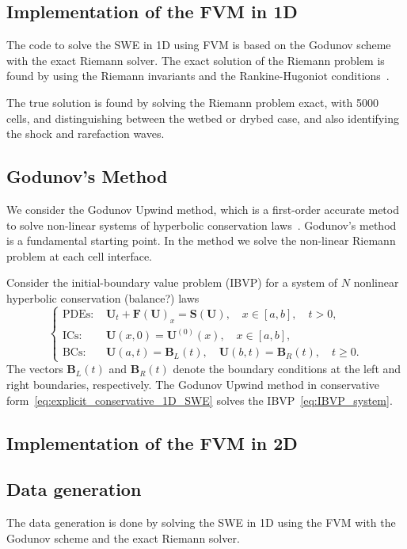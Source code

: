 \subsection{Implementation of the FVM in 1D}
The code to solve the SWE in 1D using FVM is based on the Godunov scheme with the exact Riemann solver.
The exact solution of the Riemann problem is found by using the Riemann invariants and the Rankine-Hugoniot conditions~\cite{trento_course}.

The true solution is found by solving the Riemann problem exact, with 5000 cells, and distinguishing between the wetbed or drybed case, and also identifying the shock and rarefaction waves.


\subsection{Godunov's Method}
We consider the Godunov Upwind method, which is a first-order accurate metod to solve non-linear systems of hyperbolic conservation laws~\cite{Toro2024}.
Godunov's method is a fundamental starting point.
In the method we solve the non-linear Riemann problem at each cell interface. 

Consider the initial-boundary value problem (IBVP) for a system of $N$ nonlinear hyperbolic conservation (balance?) laws     
\begin{equation}\label{eq:IBVP_system}
    \begin{cases}
    \text{PDEs: }    &\mathbf{U}_t + \mathbf{F(U)}_x = \mathbf{S(U)}, \quad x \in [a, b], \quad t > 0, \\
    \text{ICs: }    &\mathbf{U}(x,0) = \mathbf{U}^{(0)}(x), \quad x \in [a,b], \\
    \text{BCs: }    &\mathbf{U}(a,t) = \mathbf{B}_{L}(t), \quad \mathbf{U}(b,t) = \mathbf{B}_{R}(t), \quad t \geq 0.
    \end{cases}
\end{equation}
The vectors $\mathbf{B}_L (t)$ and $\mathbf{B}_R (t)$ denote the boundary conditions at the left and right boundaries, respectively.
The Godunov Upwind method in conservative form~\eqref{eq:explicit_conservative_1D_SWE} solves the IBVP~\eqref{eq:IBVP_system}.


\subsection{Implementation of the FVM in 2D}


\subsection{Data generation}
The data generation is done by solving the SWE in 1D using the FVM with the Godunov scheme and the exact Riemann solver.

